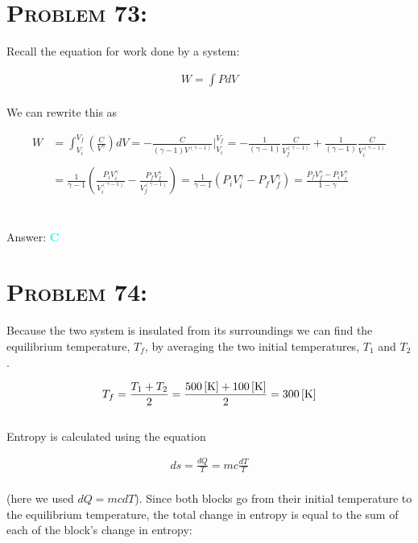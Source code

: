 \documentclass{article}
\begin{document}

\section{\textsc{Problem 73:}} Recall the equation for work done by a system:

\begin{gather}
W = \int{PdV}
\end{gather}
\\
We can rewrite this as 

\begin{align}
W &= \int_{V_{i}}^{V_{f}}{\left(  \frac{C}{V^{\gamma}}  \right) dV} = -\frac{C}{(\gamma -1 ) V^{(\gamma -1)}} \biggr\rvert_{V_{i}}^{V_{f}}  = -\frac{1}{(\gamma -1 )} \frac{C}{V_{f}^{(\gamma -1)}} + \frac{1}{(\gamma -1 )} \frac{C}{V_{i}^{(\gamma -1)}}\nonumber\\
\nonumber\\
&= \frac{1}{\gamma -1} \left(   \frac{P_{i} V_{i}^{\gamma}} { V_{i}^{(\gamma -1)} }  - \frac{P_{f} V_{f}^{\gamma}} { V_{f}^{(\gamma -1)} }   \right) =  \frac{1}{\gamma -1} \left(   P_{i} V_{i}^{\gamma} - P_{f} V_{f}^{\gamma}  \right) = \boxed{\frac{P_{f} V_{f}^{\gamma} - P_{i} V_{i}^{\gamma} } {1 - \gamma}}\nonumber
\end{align}
\\\\
Answer: \textbf{\textcolor{cyan}C}\\


\section{\textsc{Problem 74:}} Because the two system is insulated from its surroundings we can find the equilibrium temperature, $T_{f}$, by averaging the two initial temperatures, $T_{1}$ and $T_{2}$.

\begin{gather}
T_{f} = \frac{T_{1} + T_{2}}{2} = \frac{\unit[500]{[K]} + \unit[100]{[K]}}{2} = \unit[300]{[K]}\nonumber
\end{gather}
\\
Entropy is calculated using the equation 

\begin{gather}
ds = \frac{dQ}{T} = mc \frac{dT}{T}
\end{gather}
\\
(here we used $dQ = mcdT$). Since both blocks go from their initial temperature to the equilibrium temperature, the total change in entropy is equal to the sum of each of the block's change in entropy:
\end{document}
